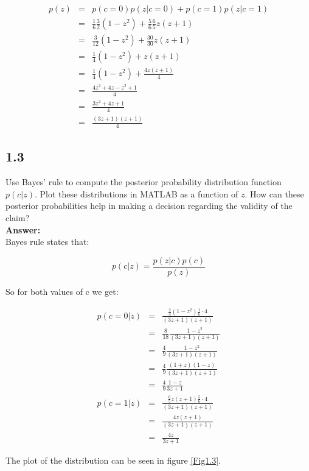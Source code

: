 \documentclass[a4paper]{article}
\begin{document}
\begin{eqnarray}
p(z) &=& p(c=0)p(z|c=0) + p(c=1)p(z|c=1)\\
&=& \frac{1}{6} \frac{3}{2}(1-z^2) + \frac{5}{6}\frac{6}{5}z(z+1)\\
&=& \frac{3}{12} (1-z^2) + \frac{30}{30} z(z+1)\\
&=& \frac{1}{4}(1-z^2) +  z(z+1)\\
&=& \frac{1}{4}(1-z^2) + \frac{4z(z+1)}{4}\\
&=& \frac{4z^2+4z-z^2+1}{4}\\
&=& \frac{3z^2+4z+1}{4}\\
&=& \frac{(3z+1)(z+1)}{4}
\end{eqnarray}



\subsection*{1.3}

Use Bayes' rule to compute the posterior probability distribution function $p(c|z)$. Plot these distributions in MATLAB as a function of $z$. How can these posterior probabilities help in making a decision regarding the validity of the claim?\\


\textbf{Answer:}\\

Bayes rule states that:

\begin{equation}
p(c|z) = \frac{p(z|c) p(c) }{p(z)}
\end{equation}

So for both values of c we get:

\begin{eqnarray}
p(c=0|z) &=& \frac{\frac{2}{3} (1-z^2) \frac{1}{6} \cdot 4}{(3z+1)(z+1)}\\
&=& \frac{8}{18} \frac{1-z^2}{(3z+1)(z+1)}\\
&=& \frac{4}{9} \frac{1-z^2}{(3z+1)(z+1)}\\
&=& \frac{4}{9} \frac{(1+z)(1-z)}{(3z+1)(z+1)}\\
&=& \frac{4}{9} \frac{1-z}{3z+1}\\
p(c=1|z) &=& \frac{\frac{6}{5} z(z+1) \frac{5}{6}\cdot 4}{(3z+1)(z+1)}\\
&=& \frac{4z(z+1)}{(3z+1)(z+1)}\\
&=& \frac{4z}{3z+1}
\end{eqnarray}

\newpage
The plot of the distribution can be seen in figure \ref{Fig1.3}.
\end{document}
